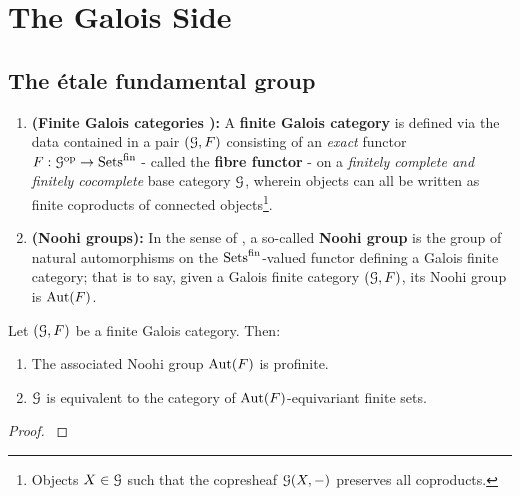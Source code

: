 \section{The Galois Side}
    \subsection{The \'etale fundamental group}
        \begin{definition} \label{def: finite_galois_categories}
            \noindent
            \begin{enumerate}
                \item \textbf{(Finite Galois categories \cite[\href{https://stacks.math.columbia.edu/tag/0BMY}{Tag 0BMY}]{stacks}):} A \textbf{finite Galois category} is defined via the data contained in a pair $(\mathcal{G}, F)$ consisting of an \textit{exact} functor $F: \mathcal{G}^{\mathrm{op}} \to \mathrm{Sets}^{\mathrm{fin}}$ - called the \textbf{fibre functor} - on a \textit{finitely complete and finitely cocomplete} base category $\mathcal{G}$, wherein objects can all be written as finite coproducts of connected objects\footnote{Objects $X \in \mathcal{G}$ such that the copresheaf $\mathcal{G}(X, -)$ preserves all coproducts.}.
                \item \textbf{(Noohi groups):} In the sense of \cite[Theorem 2.16]{noohi_fundamental_group}, a so-called \textbf{Noohi group} is the group of natural automorphisms on the $\mathrm{Sets}^{\mathrm{fin}}$-valued functor defining a Galois finite category; that is to say, given a Galois finite category $(\mathcal{G}, F)$, its Noohi group is $\mathrm{Aut}(F)$.  
            \end{enumerate}
        \end{definition}
        
        \begin{lemma} \label{lemma: profiniteness_of_noohi_groups}
            Let $(\mathcal{G}, F)$ be a finite Galois category. Then:
                \begin{enumerate}
                    \item The associated Noohi group $\mathrm{Aut}(F)$ is profinite.
                    \item $\mathcal{G}$ is equivalent to the category of $\mathrm{Aut}(F)$-equivariant finite sets.
                \end{enumerate}
        \end{lemma}
            \begin{proof}
                \cite[Theorem 2.16]{noohi_fundamental_group}
            \end{proof}
        
